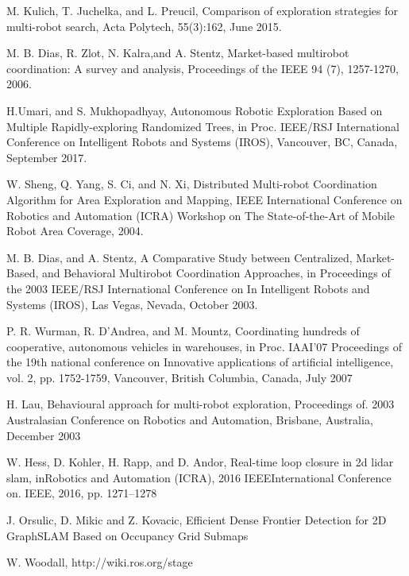 \documentclass[letterpaper, 10 pt, conference]{ieeeconf}  %
\begin{document}
\begin{thebibliography}{99}
 M. Kulich, T. Juchelka, and L. Preucil, Comparison of exploration strategies for multi-robot search, Acta Polytech, 55(3):162, June 2015. 

 M. B. Dias, R. Zlot, N. Kalra,and A. Stentz, Market-based multirobot coordination: A survey and analysis, Proceedings of the IEEE 94 (7), 1257-1270, 2006.

 H.Umari, and S. Mukhopadhyay, Autonomous Robotic Exploration Based on Multiple Rapidly-exploring Randomized Trees,  in Proc. IEEE/RSJ International Conference on Intelligent Robots and Systems (IROS), Vancouver, BC, Canada, September 2017.
  
 W. Sheng, Q. Yang, S. Ci, and N. Xi, Distributed Multi-robot Coordination Algorithm for Area Exploration and Mapping, IEEE International Conference on Robotics and Automation (ICRA) Workshop on The State-of-the-Art of Mobile Robot Area Coverage, 2004.

 M. B. Dias, and A. Stentz, A Comparative Study between Centralized, Market-Based, and Behavioral Multirobot Coordination Approaches, in Proceedings of the 2003 IEEE/RSJ  International Conference on In Intelligent Robots and Systems (IROS), Las Vegas, Nevada, October 2003.

 P. R. Wurman, R. D'Andrea, and M. Mountz, Coordinating hundreds of cooperative, autonomous vehicles in warehouses, in Proc. IAAI'07 Proceedings of the 19th national conference on Innovative applications of artificial intelligence, vol. 2, pp. 1752-1759, Vancouver, British Columbia, Canada, July 2007
 
 H. Lau, Behavioural approach for multi-robot exploration, Proceedings of. 2003 Australasian Conference on Robotics and Automation, Brisbane, Australia, December 2003

 W.  Hess,  D.  Kohler,  H.  Rapp,  and  D.  Andor, Real-time  loop  closure in  2d  lidar  slam, inRobotics  and  Automation  (ICRA), 2016  IEEEInternational Conference on. IEEE, 2016, pp. 1271–1278

 J. Orsulic, D. Mikic and Z. Kovacic, Efficient Dense Frontier Detection for 2D GraphSLAM Based on Occupancy Grid Submaps

 W. Woodall, http://wiki.ros.org/stage

\end{thebibliography}
\end{document}
